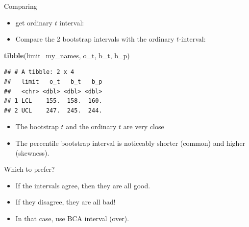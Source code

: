 \documentclass[
  ignorenonframetext,
]{beamer}
\newenvironment{Shaded}{\begin{snugshade}}{\end{snugshade}}
\newcommand{\DataTypeTok}[1]{\textcolor[rgb]{0.13,0.29,0.53}{#1}}
\newcommand{\KeywordTok}[1]{\textcolor[rgb]{0.13,0.29,0.53}{\textbf{#1}}}
\newcommand{\NormalTok}[1]{#1}
\newcommand{\OperatorTok}[1]{\textcolor[rgb]{0.81,0.36,0.00}{\textbf{#1}}}
\newcommand{\StringTok}[1]{\textcolor[rgb]{0.31,0.60,0.02}{#1}}
\providecommand{\tightlist}{%
  \setlength{\itemsep}{0pt}\setlength{\parskip}{0pt}}
\begin{document}
\begin{frame}[fragile]{Comparing}
\protect\hypertarget{comparing}{}

\begin{itemize}
\tightlist
\item
  get ordinary \(t\) interval:
\end{itemize}

\begin{Shaded}
\end{Shaded}

\begin{itemize}
\tightlist
\item
  Compare the 2 bootstrap intervals with the ordinary \(t\)-interval:
\end{itemize}

\begin{Shaded}
\begin{Highlighting}[]
\KeywordTok{tibble}\NormalTok{(}\DataTypeTok{limit=}\NormalTok{my_names, o_t, b_t, b_p)}
\end{Highlighting}
\end{Shaded}

\begin{verbatim}
## # A tibble: 2 x 4
##   limit   o_t   b_t   b_p
##   <chr> <dbl> <dbl> <dbl>
## 1 LCL    155.  158.  160.
## 2 UCL    247.  245.  244.
\end{verbatim}

\begin{itemize}
\tightlist
\item
  The bootstrap \(t\) and the ordinary \(t\) are very close
\item
  The percentile bootstrap interval is noticeably shorter (common) and
  higher (skewness).
\end{itemize}

\end{frame}

\begin{frame}{Which to prefer?}
\protect\hypertarget{which-to-prefer}{}

\begin{itemize}
\tightlist
\item
  If the intervals agree, then they are all good.
\item
  If they disagree, they are all bad!
\item
  In that case, use BCA interval (over).
\end{itemize}

\end{frame}
\end{document}
